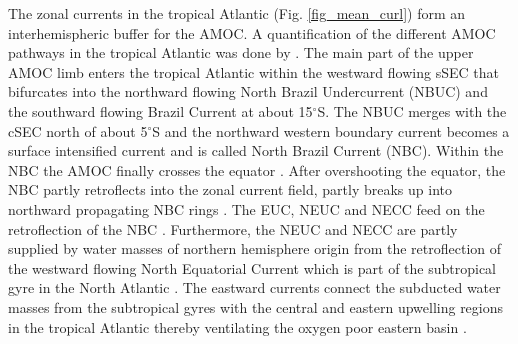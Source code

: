 \documentclass[os, manuscript]{copernicus}
\begin{document}
The zonal currents in the tropical Atlantic (Fig. \ref{fig_mean_curl}) form an interhemispheric buffer for the AMOC. A quantification of the different AMOC pathways in the tropical Atlantic was done by \cite{Tuchen2022}. The main part of the upper AMOC limb enters the tropical Atlantic within the westward flowing sSEC that bifurcates into the northward flowing North Brazil Undercurrent (NBUC) and the southward flowing Brazil Current at about 15$^{\circ}$S. The NBUC merges with the cSEC north of about 5$^{\circ}$S and the northward western boundary current becomes a surface intensified current and is called North Brazil Current (NBC). Within the NBC the AMOC finally crosses the equator \citep[e.g.][]{Schott2004,Hazeleger2006}. After overshooting the equator, the NBC partly retroflects into the zonal current field, partly breaks up into northward propagating NBC rings \citep{Johns2003}. The EUC, NEUC and NECC feed on the retroflection of the NBC \citep{Bourles1999,Huettl2008,Rosell-Fieschi2015,Stramma2005}. Furthermore, the NEUC and NECC are partly supplied by water masses of northern hemisphere origin from the retroflection of the westward flowing North Equatorial Current which is part of the subtropical gyre in the North Atlantic \cite[e.g.][]{Schott1998,Bourles1999,Urbano2008}. The eastward currents connect the subducted water masses from the subtropical gyres with the central and eastern upwelling regions in the tropical Atlantic thereby ventilating the oxygen poor eastern basin \cite[][]{Stramma2008,Urbano2008,Hahn2014,Brandt2015,Hahn2017,Burmeister2019,Burmeister2020}.
\end{document}
